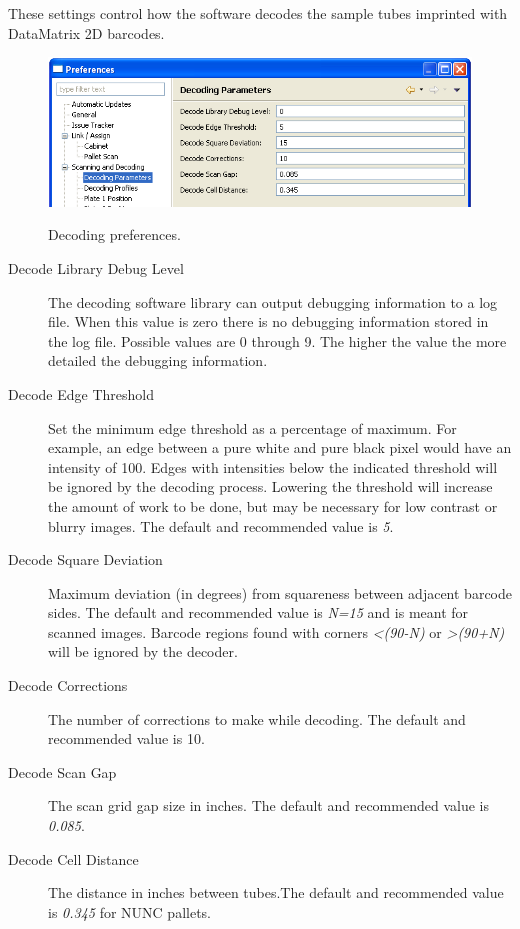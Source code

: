 These settings control how the software decodes the sample tubes imprinted with
DataMatrix 2D barcodes.
    \begin{figure}[H]
      \centering
      \scalebox{0.5}
      { \includegraphics*{screenshots/configuration/prefs_decoding_parms} }
      \caption{Decoding preferences.}
      \label{fig:prefs_decoding_parms}
    \end{figure}
\begin{description}
  \item[Decode Library Debug Level] The decoding software library can output
    debugging information to a log file. When this value is zero there is no
    debugging information stored in the log file. Possible values are 0 through
    9. The higher the value the more detailed the debugging information.
  \item[Decode Edge Threshold] Set the minimum edge threshold as a percentage
    of maximum. For example, an edge between a pure white and pure black pixel
    would have an intensity of 100.  Edges with intensities below the indicated
    threshold will be ignored by the decoding process. Lowering the threshold
    will increase the amount of work to be done, but may be necessary for low
    contrast or blurry images. The default and recommended value is \emph{5}.
  \item[Decode Square Deviation] Maximum deviation (in degrees) from squareness
    between adjacent barcode sides. The default and recommended value is
    \emph{N=15} and is meant for scanned images. Barcode regions found with
    corners \emph{<(90-N)} or \emph{>(90+N)} will be ignored by the decoder.
  \item[Decode Corrections] The number of corrections to make while
    decoding. The default and recommended value is 10.
  \item[Decode Scan Gap] The scan grid gap size in inches. The default and
    recommended value is \emph{0.085}.
  \item[Decode Cell Distance] The distance in inches between tubes.The default
    and recommended value is \emph{0.345} for NUNC pallets.
\end{description}

